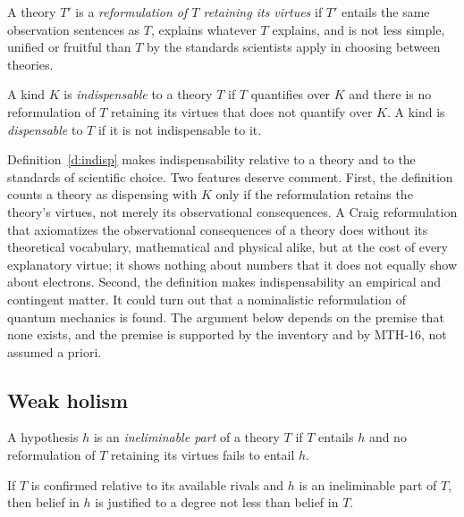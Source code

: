 \documentclass{situationist-preprint}
\begin{document}
\begin{definition}\label{d:reform}
A theory $T'$ is a \emph{reformulation of $T$ retaining its virtues} if $T'$ entails the same observation sentences as $T$, explains whatever $T$ explains, and is not less simple, unified or fruitful than $T$ by the standards scientists apply in choosing between theories.
\end{definition}

\begin{definition}[Indispensability]\label{d:indisp}
A kind $K$ is \emph{indispensable} to a theory $T$ if $T$ quantifies over $K$ and there is no reformulation of $T$ retaining its virtues that does not quantify over $K$. A kind is \emph{dispensable} to $T$ if it is not indispensable to it.
\end{definition}

Definition~\ref{d:indisp} makes indispensability relative to a theory and to the standards of scientific choice. Two features deserve comment. First, the definition counts a theory as dispensing with $K$ only if the reformulation retains the theory's virtues, not merely its observational consequences. A Craig reformulation that axiomatizes the observational consequences of a theory does without its theoretical vocabulary, mathematical and physical alike, but at the cost of every explanatory virtue; it shows nothing about numbers that it does not equally show about electrons. Second, the definition makes indispensability an empirical and contingent matter. It could turn out that a nominalistic reformulation of quantum mechanics is found. The argument below depends on the premise that none exists, and the premise is supported by the inventory and by MTH-16, not assumed a priori.

\subsection{Weak holism}

\begin{definition}\label{d:part}
A hypothesis $h$ is an \emph{ineliminable part} of a theory $T$ if $T$ entails $h$ and no reformulation of $T$ retaining its virtues fails to entail $h$.
\end{definition}

\begin{principle}\label{p:wh}
If $T$ is confirmed relative to its available rivals and $h$ is an ineliminable part of $T$, then belief in $h$ is justified to a degree not less than belief in $T$.
\end{principle}
\end{document}
